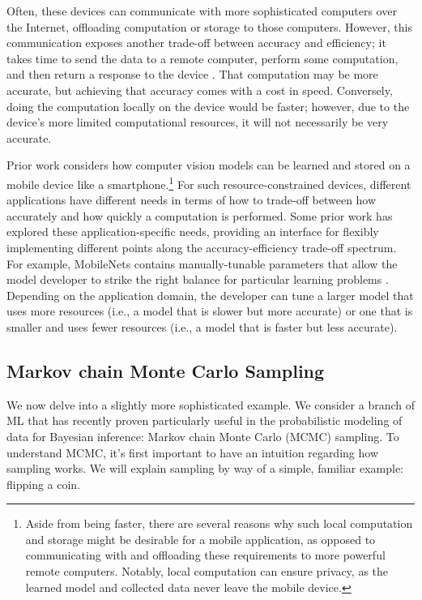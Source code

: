 \documentclass[sigplan,screen]{acmart}
\begin{document}
Often, these devices can communicate with more sophisticated computers over the Internet, offloading computation or storage to those computers. However, this communication exposes another trade-off between accuracy and efficiency; it takes time to send the data to a remote computer, perform some computation, and then return a response to the device \cite{birman2019cloud}. That computation may be more accurate, but achieving that accuracy comes with a cost in speed. Conversely, doing the computation locally on the device would be faster; however, due to the device's more limited computational resources, it will not necessarily be very accurate.

Prior work considers how computer vision models can be learned and stored on a mobile device like a smartphone.\footnote{Aside from being faster, there are several reasons why such local computation and storage might be desirable for a mobile application, as opposed to communicating with and offloading these requirements to more powerful remote computers. Notably, local computation can ensure privacy, as the learned model and collected data never leave the mobile device.} For such resource-constrained devices, different applications have different needs in terms of how to trade-off between how accurately and how quickly a computation is performed. Some prior work has explored these application-specific needs, providing an interface for flexibly implementing different points along the accuracy-efficiency trade-off spectrum. For example, MobileNets contains manually-tunable parameters that allow the model developer to strike the right balance for particular learning problems \cite{howard2017mobilenets}. Depending on the application domain, the developer can tune a larger model that uses more resources (i.e., a model that is slower but more accurate) or one that is smaller and uses fewer resources (i.e., a model that is faster but less accurate).

\subsection{Markov chain Monte Carlo Sampling} \label{sec:mcmc}
We now delve into a slightly more sophisticated example. We consider a branch of ML that has recently proven particularly useful in the probabilistic modeling of data for Bayesian inference: Markov chain Monte Carlo (MCMC) sampling. To understand MCMC, it's first important to have an intuition regarding how sampling works. We will explain sampling by way of a simple, familiar example: flipping a coin.
\end{document}
